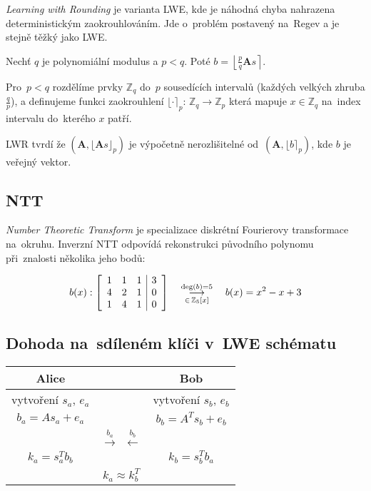\emph{Learning with Rounding} je varianta LWE, kde je náhodná chyba nahrazena deterministickým zaokrouhlováním.
Jde o~problém postavený na~Regev a je stejně těžký jako LWE.

Nechť $q$ je polynomiální modulus a $p < q$.
Poté $b = \left\lfloor \frac{p}{q} \textbf{A}s \right\rceil$.

Pro~$p < q$ rozdělíme prvky $\mathbb{Z}_q$ do~$p$ sousedících intervalů (každých velkých zhruba $\frac{q}{p}$), a definujeme funkci zaokrouhlení $\lfloor \cdot \rceil_p$: $\mathbb{Z}_q \rightarrow \mathbb{Z}_p$ která mapuje $x \in \mathbb{Z}_q$ na~index intervalu do~kterého $x$ patří.

LWR tvrdí že $(\textbf{A}, \lfloor \textbf{A}s \rfloor_p)$ je výpočetně nerozlišitelné od~$(\textbf{A}, \lfloor b \rceil_p)$, kde $b$ je veřejný vektor.


\subsection{NTT}
\label{sec:ntt}

\emph{Number Theoretic Transform} je specializace diskrétní Fourierovy transformace na~okruhu.
Inverzní NTT odpovídá rekonstrukci původního polynomu při~znalosti několika jeho bodů:

$$
b(x):
\left[\begin{array}{ccc|c}
1 & 1 & 1 & 3 \\ 4 & 2 & 1 & 0 \\ 1 & 4 & 1 & 0 \\
\end{array}\right]
\hspace*{1em}
\mathrel{\mathop{\longrightarrow}^{\text{deg}(b)=5}_{\in \, \mathbb{Z}_5[x]}}
\hspace*{1em}
b(x) = x^2 - x + 3
$$


\subsection{Dohoda na~sdíleném klíči v~LWE schématu}

\begin{table}[ht]
    \centering
    \begin{tabular}{ccc}
    Alice & & Bob \\
    \hline
    vytvoření $s_a$, $e_a$ & & vytvoření $s_b$, $e_b$ \\
    $b_a = As_a + e_a$ & & $b_b = A^Ts_b + e_b$ \\
    & $\stackrel{b_a}{\longrightarrow} \ \ \stackrel{b_b}{\longleftarrow}$ & \\
    $k_a = s_a^T b_b$ & & $k_b = s_b^T b_a$ \\
    & $k_a \approx k_b^T$ & \\
    \end{tabular}
\end{table}
\FloatBarrier

